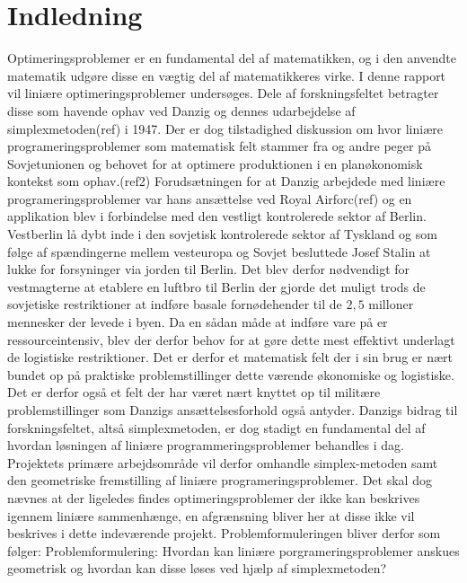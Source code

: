 \chapter{Indledning}
Optimeringsproblemer er en fundamental del af matematikken, og i den anvendte matematik udgøre disse en vægtig del af matematikkeres virke.
I denne rapport vil liniære optimeringsproblemer undersøges. Dele af forskningsfeltet betragter disse som havende ophav ved Danzig og dennes udarbejdelse af simplexmetoden(ref) i 1947.
Der er dog tilstadighed diskussion om hvor liniære programeringsproblemer som matematisk felt stammer fra og andre peger på Sovjetunionen og behovet for at optimere produktionen i en planøkonomisk kontekst som ophav.(ref2)  
Forudsætningen for at Danzig arbejdede med liniære programeringsproblemer var hans ansættelse ved Royal Airforc(ref) og en applikation blev i forbindelse med den vestligt kontrolerede sektor af Berlin.
Vestberlin lå dybt inde i den sovjetisk kontrolerede sektor af Tyskland og som følge af spændingerne mellem vesteuropa og Sovjet besluttede Josef Stalin at lukke for forsyninger via jorden til Berlin.
Det blev derfor nødvendigt for vestmagterne at etablere en luftbro til Berlin der gjorde det muligt trods de sovjetiske restriktioner at indføre basale fornødehender til de $2,5$ milloner mennesker der levede i byen.
Da en sådan måde at indføre vare på er ressourceintensiv, blev der derfor behov for at gøre dette mest effektivt underlagt de logistiske restriktioner.
Det er derfor et matematisk felt der i sin brug er nært bundet op på praktiske problemstillinger dette værende økonomiske og logistiske.
Det er derfor også et felt der har været nært knyttet op til militære problemstillinger som Danzigs ansættelsesforhold også antyder.
Danzigs bidrag til forskningsfeltet, altså simplexmetoden, er dog stadigt en fundamental del af hvordan løsningen af liniære programmeringsproblemer behandles i dag.
Projektets primære arbejdsområde vil derfor omhandle simplex-metoden samt den geometriske fremstilling af liniære programeringsproblemer.
Det skal dog nævnes at der ligeledes findes optimeringsproblemer der ikke kan beskrives igennem liniære sammenhænge, en afgrænsning bliver her at disse ikke vil beskrives i dette indeværende projekt.
Problemformuleringen bliver derfor som følger:
Problemformulering:
Hvordan kan liniære porgrameringsproblemer anskues geometrisk og hvordan kan disse løses ved hjælp af simplexmetoden?

